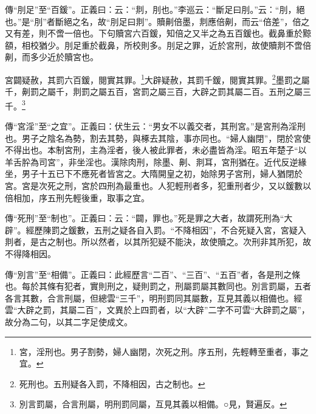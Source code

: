 {\noindent\zhuan{}\fzbyks 傳“刖足”至“百鍰”。正義曰：云：“剕，刖也。”李巡云：“斷足曰刖。”云：“刖，絕也。”是“刖”者斷絕之名，故“刖足曰剕”。贖劓倍墨，剕應倍劓，而云“倍差”，倍之又有差，則不啻一倍也。下句贖宮六百鍰，知倍之又半之為五百鍰也。截鼻重於黥頟，相校猶少。刖足重於截鼻，所校則多。刖足之罪，近於宮刑，故使贖剕不啻倍劓，而多少近於贖宮也。 \par}

宮闢疑赦，其罰六百鍰，閱實其罪。\footnote{宮，淫刑也。男子割勢，婦人幽閉，次死之刑。序五刑，先輕轉至重者，事之宜。}大辟疑赦，其罰千鍰，閱實其罪。\footnote{死刑也。五刑疑各入罰，不降相因，古之制也。}墨罰之屬千，劓罰之屬千，剕罰之屬五百，宮罰之屬三百，大辟之罰其屬二百。五刑之屬三千。\footnote{別言罰屬，合言刑屬，明刑罰同屬，互見其義以相備。○見，賢遍反。}

{\noindent\zhuan{}\fzbyks 傳“宮淫”至“之宜”。正義曰：伏生云：“男女不以義交者，其刑宮。”是宮刑為淫刑也。男子之陰名為勢，割去其勢，與椓去其陰，事亦同也。“婦人幽閉”，閉於宮使不得出也。本制宮刑，主為淫者，後人被此罪者，未必盡皆為淫。昭五年楚子“以羊舌肸為司宮”，非坐淫也。漢除肉刑，除墨、劓、剕耳，宮刑猶在。近代反逆緣坐，男子十五已下不應死者皆宮之。大隋開皇之初，始除男子宮刑，婦人猶閉於宮。宮是次死之刑，宮於四刑為最重也。人犯輕刑者多，犯重刑者少，又以鍰數以倍相加，序五刑先輕後重，取事之宜。 \par}

{\noindent\zhuan{}\fzbyks 傳“死刑”至“制也”。正義曰：云：“闢，罪也。”死是罪之大者，故謂死刑為“大辟”。經歷陳罰之鍰數，五刑之疑各自入罰。“不降相因”，不合死疑入宮，宮疑入剕者，是古之制也。所以然者，以其所犯疑不能決，故使贖之。次刑非其所犯，故不得降相因。 \par}

{\noindent\zhuan{}\fzbyks 傳“別言”至“相備”。正義曰：此經歷言“二百”、“三百”、“五百”者，各是刑之條也。每於其條有犯者，實則刑之，疑則罰之，刑屬罰屬其數同也。別言罰屬，五者各言其數，合言刑屬，但總雲“三千”，明刑罰同其屬數，互見其義以相備也。經雲“大辟之罰，其屬二百”，文異於上四罰者，以“大辟”二字不可雲“大辟罰之屬”，故分為二句，以其二字足使成文。 \par}

